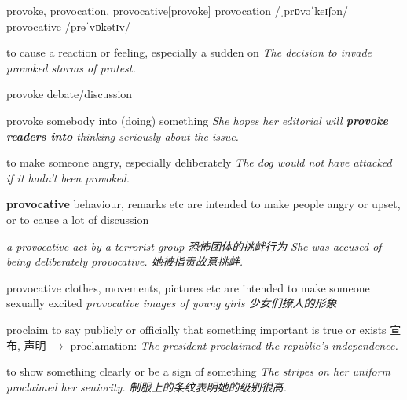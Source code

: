 \begin{DefWord}{provoke, provocation, provocative}[provoke]
    provocation /ˌprɒvəˈkeɪʃən/ provocative /prəˈvɒkətɪv/


    to cause a reaction or feeling, especially a sudden on
    \textit{The decision to invade provoked storms of protest.}

    provoke debate/discussion

    provoke somebody into (doing) something
    \textit{She hopes her editorial will \textbf{provoke readers into} thinking seriously about the issue.}

    to make someone angry, especially deliberately
    \textit{The dog would not have attacked if it hadn't been provoked.}

    \textbf{provocative}  behaviour, remarks etc are intended to make people angry or upset, or to cause a lot of discussion

    \textit{a provocative act by a terrorist group 恐怖团体的挑衅行为}
    \textit{She was accused of being deliberately provocative. 她被指责故意挑衅. }

    provocative clothes, movements, pictures etc are intended to make someone sexually excited
    \textit{provocative images of young girls 少女们撩人的形象}
\end{DefWord}

\begin{DefWord}{proclaim}
    to say publicly or officially that something important is true or exists 宣布, 声明 $\rightarrow$ proclamation:
    \textit{The president proclaimed the republic's independence.}

    to show something clearly or be a sign of something
    \textit{The stripes on her uniform proclaimed her seniority. 制服上的条纹表明她的级别很高. }

\end{DefWord}